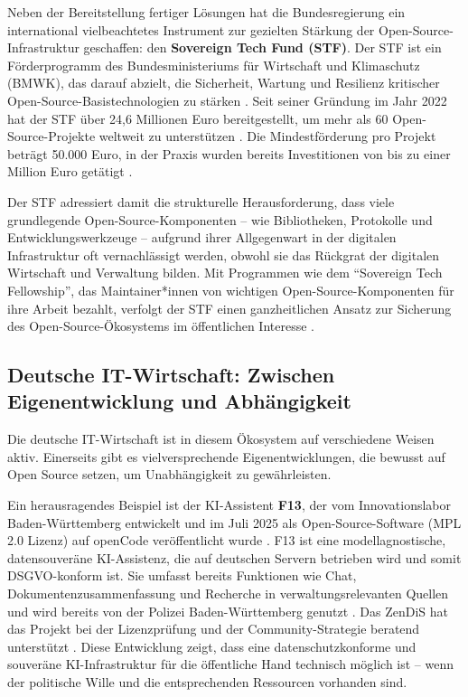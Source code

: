 \documentclass[12pt,a4paper]{article}
\begin{document}
	Neben der Bereitstellung fertiger Lösungen hat die Bundesregierung ein international vielbeachtetes Instrument zur gezielten Stärkung der Open-Source-Infrastruktur geschaffen: den \textbf{Sovereign Tech Fund (STF)}. Der STF ist ein Förderprogramm des Bundesministeriums für Wirtschaft und Klimaschutz (BMWK), das darauf abzielt, die Sicherheit, Wartung und Resilienz kritischer Open-Source-Basistechnologien zu stärken \cite{SovereignTechFund2025}. Seit seiner Gründung im Jahr 2022 hat der STF über 24,6 Millionen Euro bereitgestellt, um mehr als 60 Open-Source-Projekte weltweit zu unterstützen \cite{SovereignTechFund2025}. Die Mindestförderung pro Projekt beträgt 50.000 Euro, in der Praxis wurden bereits Investitionen von bis zu einer Million Euro getätigt \cite{SovereignTechFund2025}.
	
	Der STF adressiert damit die strukturelle Herausforderung, dass viele grundlegende Open-Source-Komponenten – wie Bibliotheken, Protokolle und Entwicklungswerkzeuge – aufgrund ihrer Allgegenwart in der digitalen Infrastruktur oft vernachlässigt werden, obwohl sie das Rückgrat der digitalen Wirtschaft und Verwaltung bilden. Mit Programmen wie dem \enquote{Sovereign Tech Fellowship}, das Maintainer*innen von wichtigen Open-Source-Komponenten für ihre Arbeit bezahlt, verfolgt der STF einen ganzheitlichen Ansatz zur Sicherung des Open-Source-Ökosystems im öffentlichen Interesse \cite{STFNews2025}.
	
	\subsection{Deutsche IT-Wirtschaft: Zwischen Eigenentwicklung und Abhängigkeit}
	
	Die deutsche IT-Wirtschaft ist in diesem Ökosystem auf verschiedene Weisen aktiv. Einerseits gibt es vielversprechende Eigenentwicklungen, die bewusst auf Open Source setzen, um Unabhängigkeit zu gewährleisten.
	
	Ein herausragendes Beispiel ist der KI-Assistent \textbf{F13}, der vom Innovationslabor Baden-Württemberg entwickelt und im Juli 2025 als Open-Source-Software (MPL 2.0 Lizenz) auf openCode veröffentlicht wurde \cite{Staatsanzeiger2025}. F13 ist eine modellagnostische, datensouveräne KI-Assistenz, die auf deutschen Servern betrieben wird und somit DSGVO-konform ist. Sie umfasst bereits Funktionen wie Chat, Dokumentenzusammenfassung und Recherche in verwaltungsrelevanten Quellen und wird bereits von der Polizei Baden-Württemberg genutzt \cite{Staatsanzeiger2025}. Das ZenDiS hat das Projekt bei der Lizenzprüfung und der Community-Strategie beratend unterstützt \cite{ZenDiS2025b}. Diese Entwicklung zeigt, dass eine datenschutzkonforme und souveräne KI-Infrastruktur für die öffentliche Hand technisch möglich ist – wenn der politische Wille und die entsprechenden Ressourcen vorhanden sind.
	
\end{document}
